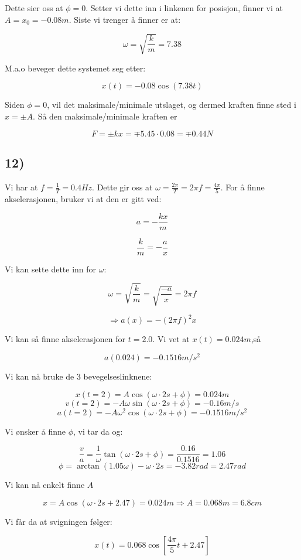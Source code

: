 \documentclass[a4paper,norsk, 10pt]{article}
\begin{document}
Dette sier oss at $\phi = 0$. Setter vi dette inn i linkenen for posisjon, finner vi at $A = x_0 = -0.08 m$. Siste vi trenger å finner er at:

$$
\omega = \sqrt{\frac{k}{m}} = 7.38
$$

M.a.o beveger dette systemet seg etter:

$$
x(t) = -0.08\cos(7.38t)
$$

Siden $\phi = 0$, vil det maksimale/minimale utslaget, og dermed kraften finne sted i $x = \pm A$. Så den maksimale/minimale kraften er

$$
F = \pm kx = \mp 5.45\cdot 0.08 = \mp 0.44 N
$$

\subsection*{12)}

Vi har at $f = \frac{1}{T} = 0.4 Hz$. Dette gir oss at $\omega = \frac{2\pi}{T} = 2\pi f = \frac{4\pi}{5}$. For å finne akselerasjonen, bruker vi at den er gitt ved:

$$
a = -\frac{kx}{m}
$$

$$
\frac{k}{m} = -\frac{a}{x}
$$

Vi kan sette dette inn for $\omega$:

$$
\omega = \sqrt{\frac{k}{m}} = \sqrt{\frac{-a}{x}} = 2\pi f
$$

$$
\Rightarrow a(x) = -(2\pi f)^2x
$$

Vi kan så finne akselerasjonen for $t=2.0$. Vi vet at $x(t) = 0.024m$,så

$$
a(0.024) = -0.1516 m/s^2
$$

Vi kan nå bruke de 3 bevegelseslinknene:

$$
x(t=2) = A\cos(\omega\cdot 2s + \phi) = 0.024m
$$
$$
v(t=2) = -A\omega \sin(\omega\cdot 2s + \phi) = -0.16 m/s
$$
$$
a(t=2) = -A\omega^2 \cos(\omega \cdot 2s + \phi) = -0.1516 m/s^2
$$

Vi ønsker å finne $\phi$, vi tar da og:

$$
\frac{v}{a} = \frac{1}{\omega}\tan(\omega \cdot 2s + \phi) = \frac{0.16}{0.1516} = 1.06
$$
$$
\phi = \arctan(1.05\omega) - \omega \cdot 2s = -3.82 rad = 2.47 rad
$$

 Vi kan nå enkelt finne $A$

$$
x = A\cos(\omega\cdot 2s + 2.47) = 0.024m \Rightarrow A = 0.068m = 6.8cm
$$

Vi får da at svigningen følger:

$$
x(t) = 0.068\cos[\frac{4\pi}{5}t + 2.47]
$$
\end{document}
